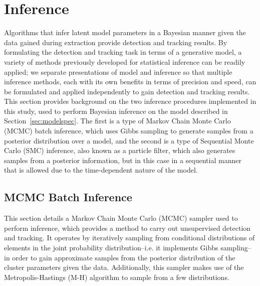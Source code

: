 \documentclass[smallcondensed, final]{svjour3}
\begin{document}
\section{Inference}
\label{sec:inference}
Algorithms that infer latent model parameters in a Bayesian manner given the data gained during extraction provide detection and tracking results. By formulating the detection and tracking task in terms of a generative model, a variety of methods previously developed for statistical inference can be readily applied; we separate presentations of model and inference so that multiple inference methods, each with its own benefits in terms of precision and speed, can be formulated and applied independently to gain detection and tracking results. This section provides background on the two inference procedures implemented in this study, used to perform Bayesian inference on the model described in Section~\ref{sec:modelspec}. The first is a type of Markov Chain Monte Carlo (MCMC) batch inference, which uses Gibbs sampling to generate samples from a posterior distribution over a model, and the second is a type of Sequential Monte Carlo (SMC) inference, also known as a particle filter, which also generates samples from a posterior information, but in this case in a sequential manner that is allowed due to the time-dependent nature of the model.


\subsection{MCMC Batch Inference}

This section details a Markov Chain Monte Carlo (MCMC) sampler used to perform inference, which provides a method to carry out unsupervised detection and tracking. It operates by iteratively sampling from conditional distributions of elements in the joint probability distribution--i.e. it implements Gibbs sampling--in order to gain approximate samples from the posterior distribution of the cluster parameters given the data. Additionally, this sampler makes use of the Metropolis-Hastings (M-H) algorithm to sample from a few distributions.
\end{document}
